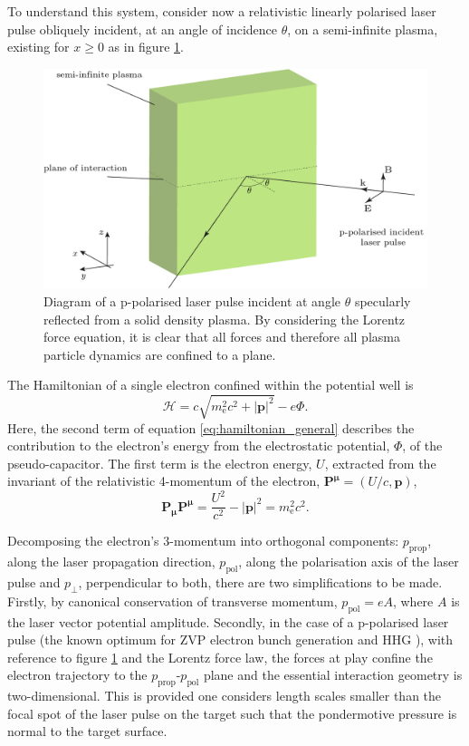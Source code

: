 To understand this system, consider now a relativistic linearly polarised laser pulse obliquely incident, at an angle of incidence $\theta$, on a semi-infinite plasma, existing for $x\ge0$ as in figure \ref{fig:zvpforcesppol}.
\begin{figure}
	\centering
	\includegraphics[width=0.7\linewidth]{figures/zvp/zvp_forces_ppol}
	\caption[Diagram of a p-polarised laser pulse incident at angle $\theta$ specularly reflected from a solid density plasma.]{Diagram of a p-polarised laser pulse incident at angle $\theta$ specularly reflected from a solid density plasma. By considering the Lorentz force equation, it is clear that all forces and therefore all plasma particle dynamics are confined to a plane.}
	\label{fig:zvpforcesppol}
\end{figure}
The Hamiltonian of a single electron confined within the potential well \cite{goldsteinClassicalMechanics2013} is
\begin{equation}\label{eq:hamiltonian_general}
	\mathcal{H} = c\sqrt{m^2_\mathrm{e}c^2 + |\mathbf{p}|^2} - e\Phi.
\end{equation}
Here, the second term of equation \ref{eq:hamiltonian_general} describes the contribution to the electron's energy from the electrostatic potential, $\Phi$, of the pseudo-capacitor. The first term is the electron energy, $U$, extracted from the invariant of the relativistic 4-momentum of the electron, $\mathbf{P^\mu} = (U/c, \mathbf{p})$,
\begin{equation}\label{eq:zvp-energy_invariant}
	\mathbf{P_\mu  P^\mu} = \frac{U^2}{c^2} - |\mathbf{p}|^2 = m^2_\mathrm{e}c^2.
\end{equation}

Decomposing the electron's 3-momentum into orthogonal components: $p_\mathrm{prop}$, along the laser propagation direction, $p_\mathrm{pol}$, along the polarisation axis of the laser pulse and $p_\perp$, perpendicular to both, there are two simplifications to be made. Firstly, by canonical conservation of transverse momentum, $p_\mathrm{pol} = eA$, where $A$ is the laser vector potential amplitude. Secondly, in the case of a p-polarised laser pulse (the known optimum for ZVP electron bunch generation \cite{savinAttosecondscaleAbsorptionExtreme2017} and \ac{HHG} \cite{baevaTheoryHighorderHarmonic2006}), with reference to figure \ref{fig:zvpforcesppol} and the Lorentz force law, the forces at play confine the electron trajectory to the  $p_\mathrm{prop}$-$p_\mathrm{pol}$ plane and the essential interaction geometry is two-dimensional. This is provided one considers length scales smaller than the focal spot of the laser pulse on the target such that the pondermotive pressure is normal to the target surface.

